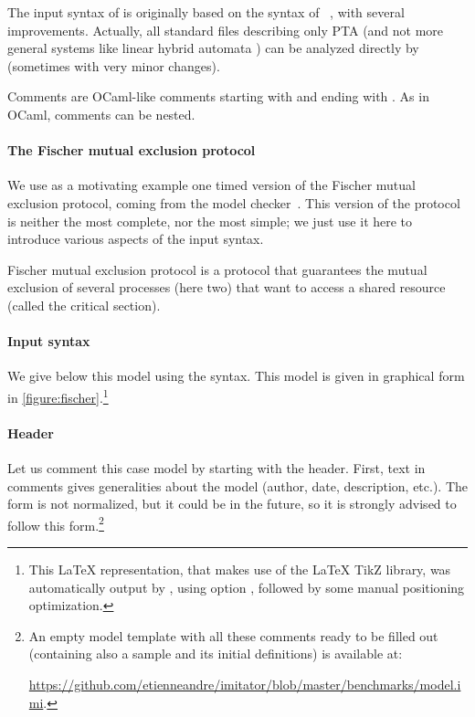 The input syntax of \imitator{} is originally based on the syntax of \hytech{}~\cite{HHW95}, with several improvements.
Actually, all standard \hytech{} files describing only PTA (and not more general systems like linear hybrid automata \cite{achh92}) can be analyzed directly by \imitator{} (sometimes with very minor changes).

Comments are OCaml-like comments starting with \styleIMI{(*} and ending with \styleIMI{*)}.
As in OCaml, comments can be nested.


\paragraph{The Fischer mutual exclusion protocol}
We use as a motivating example one timed version of the Fischer mutual exclusion protocol, coming from the \pat{} model checker~\cite{SLDP09}.
This version of the protocol is neither the most complete, nor the most simple; we just use it here to introduce various aspects of the \imitator{} input syntax.

Fischer mutual exclusion protocol is a protocol that guarantees the mutual exclusion of several processes (here two) that want to access a shared resource (called the critical section).
% 

\paragraph{Input syntax}
We give below this model using the \imitator{} syntax.
This model is given in graphical form in \cref{figure:fischer}.\footnote{%
	This \LaTeX{} representation, that makes use of the \LaTeX{} TikZ library, was automatically output by \imitator{}, using option , followed by some manual positioning optimization.
}

\bigskip





\paragraph{Header}
Let us comment this case model by starting with the header.
First, text in comments gives generalities about the model (author, date, description, etc.).
The form is not normalized, but it could be in the future, so it is strongly advised to follow this form.\footnote{%
	An empty model template with all these comments ready to be filled out (containing also a sample \IPTA{} and its initial definitions) is available at:
	
	\url{https://github.com/etienneandre/imitator/blob/master/benchmarks/model.imi}.
}

